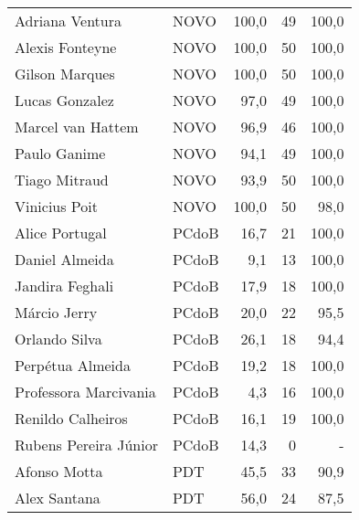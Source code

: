 \begin{longtable}{llrrr}
                     Adriana Ventura &           NOVO &     100,0 &           49 &      100,0 \\
                     Alexis Fonteyne &           NOVO &     100,0 &           50 &      100,0 \\
                      Gilson Marques &           NOVO &     100,0 &           50 &      100,0 \\
                      Lucas Gonzalez &           NOVO &      97,0 &           49 &      100,0 \\
                   Marcel van Hattem &           NOVO &      96,9 &           46 &      100,0 \\
                        Paulo Ganime &           NOVO &      94,1 &           49 &      100,0 \\
                       Tiago Mitraud &           NOVO &      93,9 &           50 &      100,0 \\
                       Vinicius Poit &           NOVO &     100,0 &           50 &       98,0 \\
                      Alice Portugal &          PCdoB &      16,7 &           21 &      100,0 \\
                      Daniel Almeida &          PCdoB &       9,1 &           13 &      100,0 \\
                     Jandira Feghali &          PCdoB &      17,9 &           18 &      100,0 \\
                        Márcio Jerry &          PCdoB &      20,0 &           22 &       95,5 \\
                       Orlando Silva &          PCdoB &      26,1 &           18 &       94,4 \\
                    Perpétua Almeida &          PCdoB &      19,2 &           18 &      100,0 \\
               Professora Marcivania &          PCdoB &       4,3 &           16 &      100,0 \\
                   Renildo Calheiros &          PCdoB &      16,1 &           19 &      100,0 \\
               Rubens Pereira Júnior &          PCdoB &      14,3 &            0 &          - \\
                        Afonso Motta &            PDT &      45,5 &           33 &       90,9 \\
                        Alex Santana &            PDT &      56,0 &           24 &       87,5 \\

\end{longtable}
